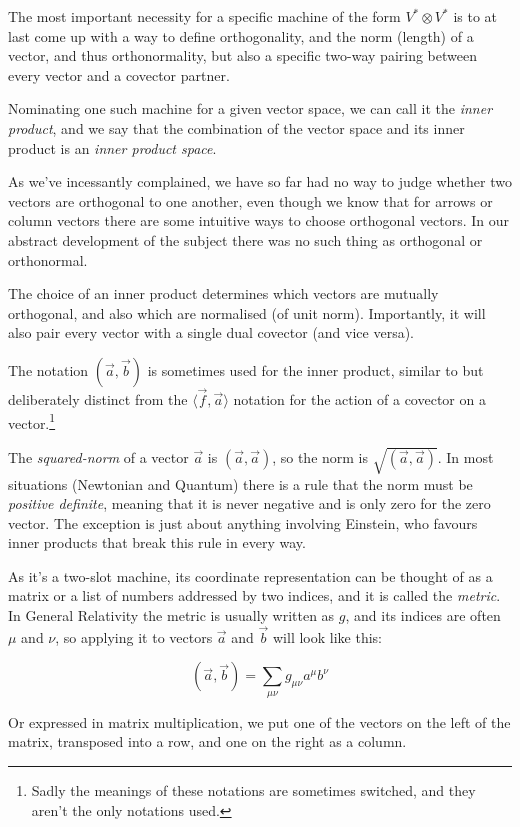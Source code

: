 The most important necessity for a specific machine of the form $V^* \otimes V^*$ is to at last come up with a way to define orthogonality, and the norm (length) of a vector, and thus orthonormality, but also a specific two-way pairing between every vector and a covector partner.

Nominating one such machine for a given vector space, we can call it the \textit{inner product}, and we say that the combination of the vector space and its inner product is an \textit{inner product space}.

As we've incessantly complained, we have so far had no way to judge whether two vectors are orthogonal to one another, even though we know that for arrows or column vectors there are some intuitive ways to choose orthogonal vectors. In our abstract development of the subject there was no such thing as orthogonal or orthonormal.

The choice of an inner product determines which vectors are mutually orthogonal, and also which are normalised (of unit norm). Importantly, it will also pair every vector with a single dual covector (and vice versa).

The notation $(\vec{a},\vec{b})$ is sometimes used for the inner product, similar to but deliberately distinct from the $\langle \vec{f},\vec{a}\rangle$ notation for the action of a covector on a vector.\footnote{Sadly the meanings of these notations are sometimes switched, and they aren't the only notations used.}

The \textit{squared-norm} of a vector $\vec{a}$ is $(\vec{a},\vec{a})$, so the norm is $\sqrt{(\vec{a},\vec{a})}$. In most situations (Newtonian and Quantum) there is a rule that the norm must be \textit{positive definite}, meaning that it is never negative and is only zero for the zero vector. The exception is just about anything involving Einstein, who favours inner products that break this rule in every way.

As it's a two-slot machine, its coordinate representation can be thought of as a matrix or a list of numbers addressed by two indices, and it is called the \textit{metric}. In General Relativity the metric is usually written as $g$, and its indices are often $\mu$ and $\nu$, so applying it to vectors $\vec{a}$ and $\vec{b}$ will look like this:

$$
(\vec{a},\vec{b}) = \sum_{\mu\nu} g_{\mu\nu} a^\mu b^\nu
$$

Or expressed in matrix multiplication, we put one of the vectors on the left of the matrix, transposed into a row, and one on the right as a column.

